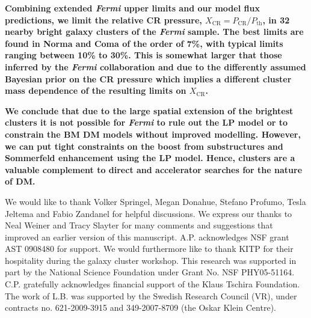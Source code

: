 \documentclass[10pt,aps,pra,reprint,amsmath,amsfonts,amssymb,showpacs,nofootinbib,floatfix]{revtex4-1}
\def\C#1{{\bf #1}}
\newcommand{\Fermi}{{\em Fermi}\xspace}
\newcommand{\rmn}{\mathrm}
\newcommand{\CR}{\rmn{CR}}
\begin{document}
\C{Combining extended \Fermi upper limits and our model flux predictions, we
  limit the relative CR pressure, $X_\CR = P_\CR/P_\rmn{th}$, in 32 nearby
  bright galaxy clusters of the \Fermi sample. The best limits are found in
  Norma and Coma of the order of 7\%, with typical limits ranging between 10\%
  to 30\%. This is somewhat larger that those inferred by the \Fermi
  collaboration \citep{2010ApJ...717L..71A} and due to the differently assumed
  Bayesian prior on the CR pressure which implies a different cluster mass
  dependence of the resulting limits on $X_\CR$. }

\C{We conclude that due to the large spatial extension of the
  brightest clusters it is not possible for \Fermi to rule out the LP
  model or to constrain the BM DM models without improved
  modelling. However, we can put tight constraints on the boost from
  substructures and Sommerfeld enhancement using the LP model. Hence,
  clusters are a valuable complement to direct and accelerator
  searches for the nature of DM.}






\smallskip We would like to thank Volker Springel, Megan Donahue,
Stefano Profumo, Tesla Jeltema and Fabio Zandanel for helpful
discussions.  We express our thanks to Neal Weiner and Tracy Slayter
for many comments and suggestions that improved an earlier version of
this manuscript. A.P. acknowledges NSF grant AST 0908480 for
support. We would furthermore like to thank KITP for their hospitality
during the galaxy cluster workshop.  This research was supported in
part by the National Science Foundation under Grant No. NSF
PHY05-51164.  C.P. gratefully acknowledges financial support of the
Klaus Tschira Foundation. The work of L.B. was supported by the
Swedish Research Council (VR), under contracts no. 621-2009-3915 and
349-2007-8709 (the Oskar Klein Centre).


%


\vspace{-0.7cm}

%
%

\appendix
\end{document}
